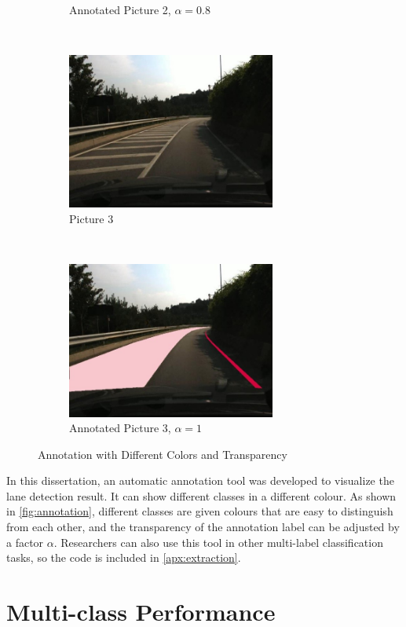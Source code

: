 \begin{spacing}{1.5}
\begin{figure}[!ht]
\begin{subfigure}[b]{0.49\textwidth}
        \caption{Annotated Picture 2, $\alpha=0.8$}
    \end{subfigure}
    \\
    \begin{subfigure}[b]{0.49\textwidth}
        \centering
        \includegraphics[width=2.7in, fbox]{Chapter5/Picture3.jpg}
        \caption{Picture 3}
    \end{subfigure}%
    ~
    \begin{subfigure}[b]{0.49\textwidth}
        \centering
        \includegraphics[width=2.7in, fbox]{Chapter5/Picture3an.jpg}
        \caption{Annotated Picture 3, $\alpha=1$}
    \end{subfigure}
    \caption{Annotation with Different Colors and Transparency}
    \label{fig:annotation}
\end{figure}


In this dissertation, an automatic annotation tool was developed to visualize the lane detection result. It can show different classes in a different colour. As shown in \autoref{fig:annotation}, different classes are given colours that are easy to distinguish from each other, and the transparency of the annotation label can be adjusted by a factor $\alpha$. Researchers can also use this tool in other multi-label classification tasks, so the code is included in \autoref{apx:extraction}.

\section{Multi-class Performance}
\label{sec:EX_multiclass}


\end{spacing}
